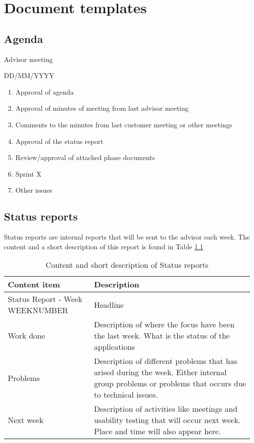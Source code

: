\chapter{Document templates}
\label{apx:templates}

\section{Agenda}
\label{sec:advisoragenda}
Advisor meeting

DD/MM/YYYY \\



\large
\begin{enumerate} 
	\item Approval of agenda
	\item Approval of minutes of meeting from last advisor meeting
	\item Comments to the minutes from last customer meeting or other meetings
	\item Approval of the status report
	\item Review/approval of attached phase documents
	\item Sprint X
	\item Other issues
\end{enumerate}

\section{Status reports}
\label{sec:statusreports}
Status reports are internal reports that will be sent to the advisor each week. The content and a short description of this report is found in Table \ref{tab:status-report-template}


\begin{table}[ht]
	\centering 
	\begin{tabular}{ l p{6.0cm} }
	
		\hline
		Content item & Description \\
		\hline
		Status Report - Week WEEKNUMBER & Headline \\
		\hline
		Work done & Description of where the focus have been the last week. What is the status of the applications \\
		\hline
		Problems & Description of different problems that has arised during the week. Either internal group problems or problems that occurs due to technical issues. \\
		\hline
		Next week & Description of activities like meetings and usability testing that will occur next week. Place and time will also appear here. \\
		\hline
	\end{tabular}
\caption[Status reports]{Content and short description of Status reports}
\label{tab:status-report-template}
	
\end{table}
